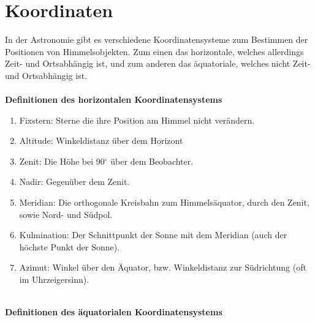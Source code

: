 \documentclass[a4paper,12pt]{article}
\begin{document}
\section{Koordinaten}
In der Astronomie gibt es verschiedene Koordinatensysteme zum Bestimmen der Positionen von Himmelsobjekten. Zum einen das horizontale, welches allerdings Zeit- und Ortsabhängig ist, und zum anderen das äquatoriale, welches nicht Zeit- und Ortsabhängig ist.
\\\hfill\\\textbf{Definitionen des horizontalen Koordinatensystems}
\begin{enumerate}[label=$\cdot$]
        \item Fixstern: Sterne die ihre Position am Himmel nicht verändern.
        \item Altitude: Winkeldistanz über dem Horizont
        \item Zenit: Die Höhe bei 90$^\circ$ über dem Beobachter.
        \item Nadir: Gegenüber dem Zenit.
        \item Meridian: Die orthogonale Kreisbahn zum Himmelsäquator, durch den Zenit, sowie Nord- und Südpol.
        \item Kulmination: Der Schnittpunkt der Sonne mit dem Meridian (auch der höchste Punkt der Sonne).
        \item Azimut: Winkel über den Äquator, bzw. Winkeldistanz zur Südrichtung (oft im Uhrzeigersinn).
\end{enumerate}
\hfill\\\textbf{Definitionen des äquatorialen Koordinatensystems}
\end{document}
